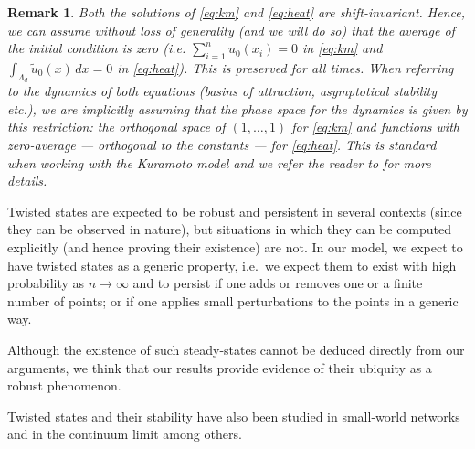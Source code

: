 \documentclass[a4paper,11pt]{amsart}
\newtheorem{remark}[theorem]{Remark}
\newcommand{\red}[1]{{#1}}
\numberwithin{equation}{section}
\numberwithin{theorem}{section}
\theoremstyle{definition}
\begin{document}
\begin{remark}
Both the solutions of \eqref{eq:km} and \eqref{eq:heat} are shift-invariant. Hence, we can assume without loss of generality (and we will do so) that the average of the initial condition is zero (i.e. $\sum_{i=1}^n u_0(x_i)=0$ in \eqref{eq:km} and $\int_{\Lambda_d} \tilde u_0(x) \, dx = 0$ in \eqref{eq:heat}). This is preserved for all times. When referring to the dynamics of both equations (basins of attraction, asymptotical stability etc.), we are implicitly assuming that the phase space for the dynamics is given by this restriction: the orthogonal space of $(1, \dots, 1)$ for \eqref{eq:km} and functions with zero-average --- orthogonal to the constants --- for \eqref{eq:heat}. \red{This is standard when working with the Kuramoto model and we refer the reader to \cite[Chapter 17]{bullo2020lectures} for more details.}
\end{remark}


Twisted states are expected to be robust and persistent in several contexts (since they can be observed in nature), but situations in which they can be computed explicitly (and hence proving their existence) are not. In our model, we expect to have twisted states as a generic property, i.e.~we expect them to exist with high probability as $n\to\infty$ and to persist if one adds or removes one or a finite number of points; or if one applies small perturbations to the points in a generic way.

Although the existence of such steady-states cannot be deduced directly from our arguments, we think that our results provide evidence of their ubiquity as a robust phenomenon.

Twisted states and their stability have also been studied in small-world networks \cite{MedvedevSmallWorld} and in the continuum limit \cite{MedvedevContTwist} among others.
\end{document}
